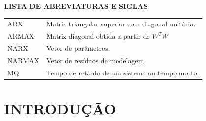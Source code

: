 \documentclass[a4paper,12pt]{article}
\begin{document}
\newpage


\thispagestyle{empty}

\begin{center}
{\large \textbf{LISTA DE ABREVIATURAS E SIGLAS}}
\end{center}

\vspace{3cm}

\begin{tabular}{ l l }
ARX\hspace{1.5cm} & Matriz triangular superior com diagonal unitária.\\
ARMAX\hspace{1.5cm} & Matriz diagonal obtida a partir de $W^{T}W$\\
NARX\hspace{1.5cm}&Vetor de parâmetros.\\
NARMAX\hspace{1.5cm}&Vetor de resíduos de modelagem.\\
MQ\hspace{1.5cm}&Tempo de retardo de um sistema ou tempo morto.\\
\end{tabular}

\newpage


\thispagestyle{empty}

\begin{center}
\listoffigures
\end{center}

\newpage


\thispagestyle{empty}

\begin{center}
\tableofcontents
\end{center}

\newpage


\thispagestyle{main}

\section{INTRODUÇÃO}
\end{document}
